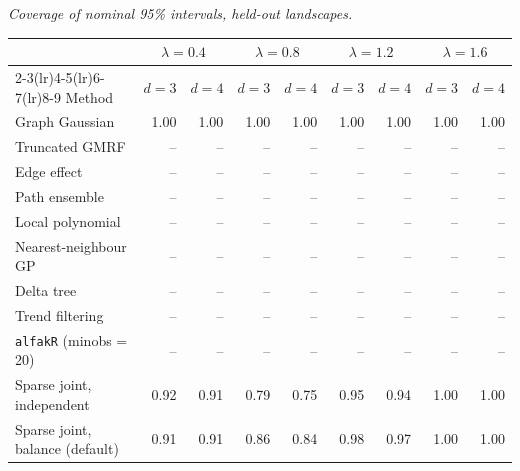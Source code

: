 \par\medskip\noindent\begin{minipage}{\linewidth}
\textit{Coverage of nominal 95\% intervals, held-out landscapes.}
\begin{center}
\footnotesize
\setlength{\tabcolsep}{3.5pt}
\begin{tabular}{l*{8}{r}}
\toprule
 & \multicolumn{2}{c}{$\lambda=0.4$} & \multicolumn{2}{c}{$\lambda=0.8$} & \multicolumn{2}{c}{$\lambda=1.2$} & \multicolumn{2}{c}{$\lambda=1.6$} \\
\cmidrule(lr){2-3}\cmidrule(lr){4-5}\cmidrule(lr){6-7}\cmidrule(lr){8-9}
Method & $d=3$ & $d=4$ & $d=3$ & $d=4$ & $d=3$ & $d=4$ & $d=3$ & $d=4$ \\
\midrule
Graph Gaussian & 1.00 & 1.00 & 1.00 & 1.00 & 1.00 & 1.00 & 1.00 & 1.00 \\
Truncated GMRF & -- & -- & -- & -- & -- & -- & -- & -- \\
Edge effect & -- & -- & -- & -- & -- & -- & -- & -- \\
Path ensemble & -- & -- & -- & -- & -- & -- & -- & -- \\
Local polynomial & -- & -- & -- & -- & -- & -- & -- & -- \\
Nearest-neighbour GP & -- & -- & -- & -- & -- & -- & -- & -- \\
Delta tree & -- & -- & -- & -- & -- & -- & -- & -- \\
Trend filtering & -- & -- & -- & -- & -- & -- & -- & -- \\
\texttt{alfakR} (minobs = 20) & -- & -- & -- & -- & -- & -- & -- & -- \\
Sparse joint, independent & 0.92 & 0.91 & 0.79 & 0.75 & 0.95 & 0.94 & 1.00 & 1.00 \\
Sparse joint, balance (default) & 0.91 & 0.91 & 0.86 & 0.84 & 0.98 & 0.97 & 1.00 & 1.00 \\
\bottomrule
\end{tabular}
\end{center}
\end{minipage}

